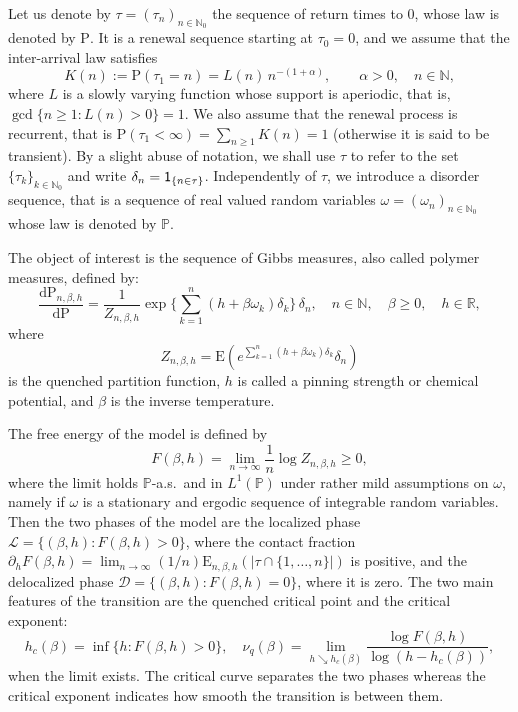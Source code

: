 \documentclass[11pt]{article}
\theoremstyle{definition}
\numberwithin{equation}{section}
\numberwithin{figure}{section}
\numberwithin{table}{section}
\newcommand{\bbN}{{\ensuremath{\mathbb N}}}
\newcommand{\bbP}{{\ensuremath{\mathbb P}}}
\newcommand{\bbR}{{\ensuremath{\mathbb R}}}
\newcommand{\cD}{{\ensuremath{\mathcal D}}}
\newcommand{\cL}{{\ensuremath{\mathcal L}}}
\newcommand{\ga}{\alpha}
\newcommand{\gb}{\beta}
\newcommand{\gd}{\delta}
\newcommand{\go}{\omega}
\newcommand{\dd}{\mathrm{d}}
\newcommand\bP{\ensuremath{\mathrm{P}}}
\newcommand\bE{\ensuremath{\mathrm{E}}}
\newcommand{\ind}{{\sf 1}}
\begin{document}
Let us denote by $\tau = (\tau_n)_{n\in\bbN_0}$ the sequence of return times to $0$, whose law is denoted by $\bP$. It is a renewal sequence starting at $\tau_0 = 0$, and we assume that the inter-arrival law satisfies
\begin{equation}\label{eq:defK_regvar}
K(n) := \bP(\tau_1 = n) = L(n) \, n^{- (1 + \ga)},\qquad \ga > 0,\quad n\in\bbN,
\end{equation}
where $L$ is a slowly varying function whose support is aperiodic, that is, $\gcd\{n \geq 1 \colon L(n) > 0\}= 1$. We also assume that the renewal process is recurrent, that is $\bP(\tau_1 < \infty) = \sum_{n\ge 1} K(n) = 1$ (otherwise it is said to be transient). By a slight abuse of notation, we shall use $\tau$ to refer to the set $\{\tau_k\}_{k\in\bbN_0}$ and write $\gd_n = \ind_{\{n\in\tau\}}$. Independently of $\tau$, we introduce a disorder sequence, that is a sequence of real valued random variables $\go = (\go_n)_{n\in \bbN_0}$ whose law is denoted by $\bbP$.

The object of interest is the sequence of Gibbs measures, also called polymer measures, defined by:
\begin{equation}\label{eq:defquemeas}
\frac{\dd \bP_{n,\gb,h}}{\dd \bP} = \frac{1}{Z_{n,\gb,h}} \exp \bigg\{\sum_{k=1}^n (h + \gb \go_k)\gd_k \bigg\} \,\gd_n, \quad n \in \bbN, \quad \gb \geq 0, \quad h \in \bbR,
\end{equation}
where
\begin{equation}\label{eq:defquepf}
Z_{n,\gb,h} = \bE \left(e^{\sum_{k=1}^n (h + \gb \go_k) \gd_k} \gd_n \right)
\end{equation}
is the quenched partition function, $h$ is called a pinning strength or chemical potential, and $\gb$ is the inverse temperature.

The free energy of the model is defined by
\begin{equation}
F(\gb,h) = \lim_{n \to \infty} \frac{1}{n} \log Z_{n,\gb,h} \geq 0,
\end{equation}
where the limit holds $\bbP$-a.s.~and in $L^1(\bbP)$ under rather mild assumptions on $\go$, namely if $\go$ is a stationary and ergodic sequence of integrable random variables. Then the two phases of the model are the localized phase $\cL = \{(\gb, h): F(\gb, h)>0\}$, where the contact fraction $\partial_h F(\gb,h) = \lim_{n \to \infty} (1/n) \bE_{n,\gb,h}(|\tau \cap \{1,\ldots,n\}|)$ is positive, and the delocalized phase $\cD = \{(\gb, h): F(\gb, h)=0\}$, where it is zero. The two main features of the transition are the quenched critical point and the critical exponent:
\begin{equation}
h_c(\gb) = \inf\{h \colon F(\gb,h) > 0\},\quad \nu_q(\gb) = \lim_{h \searrow h_c(\gb)} \frac{\log F(\gb,h)}{\log (h - h_c(\gb))},
\end{equation}
when the limit exists. The critical curve separates the two phases whereas the critical exponent indicates how smooth the transition is between them.
\end{document}

